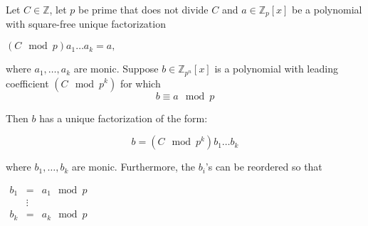 \begin{frame}

\vskip 10cm
\end{frame}



\begin{frame}
	
	\begin{theorem}
		Let $C\in \mathbb Z$, let $p$ be prime that does not divide $C$ and $a\in \mathbb Z_{p}[x]$ be a polynomial with square-free unique factorization
		
		\hfil\hfil$
		(C\mod p) a_1\dots a_k =  a,
		$ 
		 
		where $a_1, \dots, a_k$ are monic. Suppose $b\in \mathbb Z_{p^n}[x]$ is a polynomial with leading coefficient $\left(C \mod p^k\right) $ for which \[b \equiv  a \mod p \]
		
		
		Then $b$ has a unique factorization of the form:
		
		\[
		b =(C \mod p^{k}) b_1\dots b_k 
		\]
		
		where $b_1, \dots, b_k $ are monic.
		Furthermore, the $b_i$'s can be reordered so that 
		
		\hfil\hfil$
		\begin{array}{rcl}
		b_1 &=& a_1 \mod p\\
		&\vdots\\
		b_k&=& a_k \mod p
		\end{array}
		$
	\end{theorem}
	
\end{frame}

